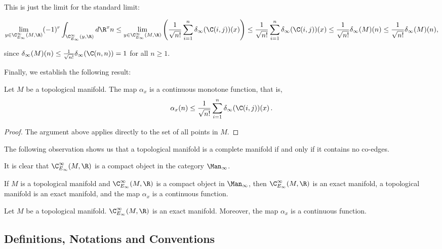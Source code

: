 \documentclass[a4paper,reqno,oneside]{article}
\begin{document}
This is just the limit for the standard limit:

\[
    \lim_{y \in \C^{\infty}_{E_\infty}(M, \R)} (-1)^r \int_{\C^{\infty}_{E_\infty}(y, \R)} d\R^xn \leq \lim_{y \in \C^{\infty}_{E_\infty}(M, \R)} \left(\frac{1}{\sqrt{n!}} \sum_{i=1}^{n} \delta_{\infty}(\C(i, j))(x) \right) \leq \frac{1}{\sqrt{n!}} \sum_{i=1}^n \delta_{\infty}(\C(i, j))(x) \leq \frac{1}{\sqrt{n!}} \delta_{\infty}(M)(n) \leq \frac{1}{\sqrt{n!}} \delta_{\infty}(M)(n),
\]

since $\delta_{\infty}(M)(n) \leq \frac{1}{\sqrt{n!}} \delta_{\infty}(\C(n, n)) = 1$ for all $n \ge 1$.

Finally, we establish the following result:

\begin{theorem}
    Let $M$ be a topological manifold. The map $\alpha_x$ is a continuous monotone function, that is,
    \[
        \alpha_x(n) \leq \frac{1}{\sqrt{n!}} \sum_{i=1}^n \delta_{\infty}(\C(i, j))(x) \,.
    \]
\end{theorem}

\begin{proof}
    The argument above applies directly to the set of all points in $M$.
\end{proof}

The following observation shows us that a topological manifold is a complete manifold if and only if it contains no co-edges. 

\begin{remark}
    It is clear that $\C^{\infty}_{E_\infty}(M, \R)$ is a compact object in the category $\Man_{\infty}$.
\end{remark}

If $M$ is a topological manifold and $\C^{\infty}_{E_\infty}(M, \R)$ is a compact object in $\Man_{\infty}$, then $\C^{\infty}_{E_\infty}(M, \R)$ is an exact manifold, a topological manifold is an exact manifold, and the map $\alpha_x$ is a continuous function.

\begin{theorem}
    Let $M$ be a topological manifold. $\C^{\infty}_{E_\infty}(M, \R)$ is an exact manifold. Moreover, the map $\alpha_x$ is a continuous function.
\end{theorem}

\subsection{Definitions, Notations and Conventions}
\end{document}
